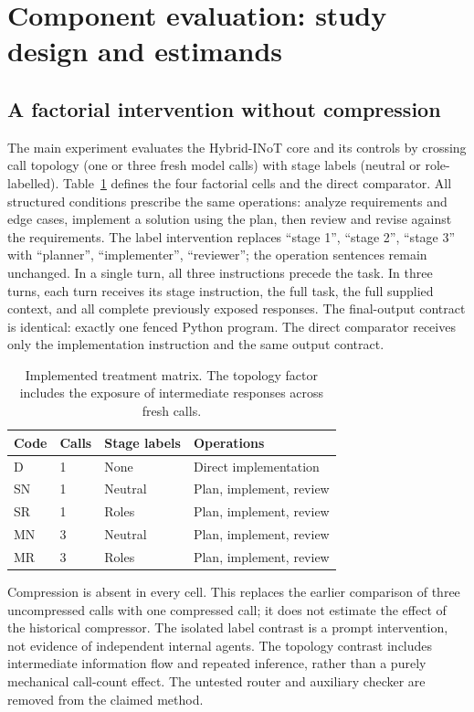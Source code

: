 \section{Component evaluation: study design and estimands}
\label{sec:heldout-methods}

\subsection{A factorial intervention without compression}
The main experiment evaluates the Hybrid-INoT core and its controls by crossing call topology (one or three fresh model calls) with stage labels (neutral or role-labelled). Table~\ref{tab:design} defines the four factorial cells and the direct comparator. All structured conditions prescribe the same operations: analyze requirements and edge cases, implement a solution using the plan, then review and revise against the requirements. The label intervention replaces ``stage 1'', ``stage 2'', ``stage 3'' with ``planner'', ``implementer'', ``reviewer''; the operation sentences remain unchanged. In a single turn, all three instructions precede the task. In three turns, each turn receives its stage instruction, the full task, the full supplied context, and all complete previously exposed responses. The final-output contract is identical: exactly one fenced Python program. The direct comparator receives only the implementation instruction and the same output contract.

\begin{table}[htbp]\centering
\caption{Implemented treatment matrix. The topology factor includes the exposure of intermediate responses across fresh calls.}\label{tab:design}
\begin{tabular}{llll}\toprule
Code & Calls & Stage labels & Operations\\\midrule
D & 1 & None & Direct implementation\\
SN & 1 & Neutral & Plan, implement, review\\
SR & 1 & Roles & Plan, implement, review\\
MN & 3 & Neutral & Plan, implement, review\\
MR & 3 & Roles & Plan, implement, review\\\bottomrule
\end{tabular}\end{table}

Compression is absent in every cell. This replaces the earlier comparison of three uncompressed calls with one compressed call; it does not estimate the effect of the historical compressor. The isolated label contrast is a prompt intervention, not evidence of independent internal agents. The topology contrast includes intermediate information flow and repeated inference, rather than a purely mechanical call-count effect. The untested router and auxiliary checker are removed from the claimed method.

